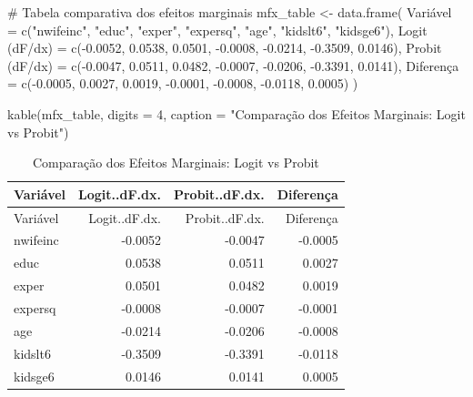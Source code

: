 \documentclass[
  letterpaper,
  DIV=11,
  numbers=noendperiod]{scrartcl}
\newenvironment{Shaded}{\begin{snugshade}}{\end{snugshade}}
\newcommand{\AttributeTok}[1]{\textcolor[rgb]{0.40,0.45,0.13}{#1}}
\newcommand{\CommentTok}[1]{\textcolor[rgb]{0.37,0.37,0.37}{#1}}
\newcommand{\DecValTok}[1]{\textcolor[rgb]{0.68,0.00,0.00}{#1}}
\newcommand{\FloatTok}[1]{\textcolor[rgb]{0.68,0.00,0.00}{#1}}
\newcommand{\FunctionTok}[1]{\textcolor[rgb]{0.28,0.35,0.67}{#1}}
\newcommand{\NormalTok}[1]{\textcolor[rgb]{0.00,0.23,0.31}{#1}}
\newcommand{\OtherTok}[1]{\textcolor[rgb]{0.00,0.23,0.31}{#1}}
\newcommand{\SpecialCharTok}[1]{\textcolor[rgb]{0.37,0.37,0.37}{#1}}
\newcommand{\StringTok}[1]{\textcolor[rgb]{0.13,0.47,0.30}{#1}}
\begin{document}
\begin{Shaded}
\begin{Highlighting}[]
\CommentTok{\# Tabela comparativa dos efeitos marginais}
\NormalTok{mfx\_table }\OtherTok{\textless{}{-}} \FunctionTok{data.frame}\NormalTok{(}
\NormalTok{  Variável }\OtherTok{=} \FunctionTok{c}\NormalTok{(}\StringTok{"nwifeinc"}\NormalTok{, }\StringTok{"educ"}\NormalTok{, }\StringTok{"exper"}\NormalTok{, }\StringTok{"expersq"}\NormalTok{, }\StringTok{"age"}\NormalTok{, }\StringTok{"kidslt6"}\NormalTok{, }\StringTok{"kidsge6"}\NormalTok{),}
  \StringTok{\textasciigrave{}}\AttributeTok{Logit (dF/dx)}\StringTok{\textasciigrave{}} \OtherTok{=} \FunctionTok{c}\NormalTok{(}\SpecialCharTok{{-}}\FloatTok{0.0052}\NormalTok{, }\FloatTok{0.0538}\NormalTok{, }\FloatTok{0.0501}\NormalTok{, }\SpecialCharTok{{-}}\FloatTok{0.0008}\NormalTok{, }\SpecialCharTok{{-}}\FloatTok{0.0214}\NormalTok{, }\SpecialCharTok{{-}}\FloatTok{0.3509}\NormalTok{, }\FloatTok{0.0146}\NormalTok{),}
  \StringTok{\textasciigrave{}}\AttributeTok{Probit (dF/dx)}\StringTok{\textasciigrave{}} \OtherTok{=} \FunctionTok{c}\NormalTok{(}\SpecialCharTok{{-}}\FloatTok{0.0047}\NormalTok{, }\FloatTok{0.0511}\NormalTok{, }\FloatTok{0.0482}\NormalTok{, }\SpecialCharTok{{-}}\FloatTok{0.0007}\NormalTok{, }\SpecialCharTok{{-}}\FloatTok{0.0206}\NormalTok{, }\SpecialCharTok{{-}}\FloatTok{0.3391}\NormalTok{, }\FloatTok{0.0141}\NormalTok{),}
  \StringTok{\textasciigrave{}}\AttributeTok{Diferença}\StringTok{\textasciigrave{}} \OtherTok{=} \FunctionTok{c}\NormalTok{(}\SpecialCharTok{{-}}\FloatTok{0.0005}\NormalTok{, }\FloatTok{0.0027}\NormalTok{, }\FloatTok{0.0019}\NormalTok{, }\SpecialCharTok{{-}}\FloatTok{0.0001}\NormalTok{, }\SpecialCharTok{{-}}\FloatTok{0.0008}\NormalTok{, }\SpecialCharTok{{-}}\FloatTok{0.0118}\NormalTok{, }\FloatTok{0.0005}\NormalTok{)}
\NormalTok{)}

\FunctionTok{kable}\NormalTok{(mfx\_table, }\AttributeTok{digits =} \DecValTok{4}\NormalTok{, }\AttributeTok{caption =} \StringTok{"Comparação dos Efeitos Marginais: Logit vs Probit"}\NormalTok{)}
\end{Highlighting}
\end{Shaded}

\begin{longtable}[]{@{}lrrr@{}}
\caption{Comparação dos Efeitos Marginais: Logit vs
Probit}\tabularnewline
\toprule\noalign{}
Variável & Logit..dF.dx. & Probit..dF.dx. & Diferença \\
\midrule\noalign{}
\endfirsthead
\toprule\noalign{}
Variável & Logit..dF.dx. & Probit..dF.dx. & Diferença \\
\midrule\noalign{}
\endhead
\bottomrule\noalign{}
\endlastfoot
nwifeinc & -0.0052 & -0.0047 & -0.0005 \\
educ & 0.0538 & 0.0511 & 0.0027 \\
exper & 0.0501 & 0.0482 & 0.0019 \\
expersq & -0.0008 & -0.0007 & -0.0001 \\
age & -0.0214 & -0.0206 & -0.0008 \\
kidslt6 & -0.3509 & -0.3391 & -0.0118 \\
kidsge6 & 0.0146 & 0.0141 & 0.0005 \\
\end{longtable}
\end{document}
